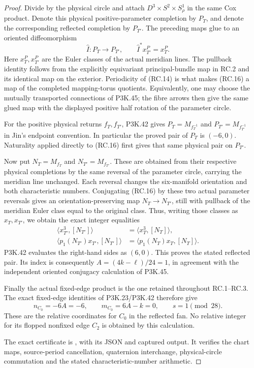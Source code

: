 \begin{proof}
Divide by the physical circle and attach
\(D^3\times S^2\times S^1_\rho\) in the same Cox product. Denote
this physical positive-parameter completion by \(P_T\), and denote
the corresponding reflected completion by \(P_{T'}\). The preceding
maps glue to an oriented diffeomorphism
\[
              \widehat I:P_T\longrightarrow P_{T'},
       \qquad \widehat I^*x^P_{T'}=x^P_T.            \tag{RC.16}
\]
Here \(x^P_T,x^P_{T'}\) are the Euler classes of the actual meridian
lines. The pullback identity follows from the explicitly equivariant
principal-bundle map in RC.2 and its identical map on the exterior.
Periodicity of (RC.14) is what makes (RC.16) a map of the completed
mapping-torus quotients. Equivalently, one may choose the mutually
transported connections of P3K.45; the fibre arrows then give the
same glued map with the displayed positive half rotation of the
parameter circle.

For the positive physical returns \(f_T,f_{T'}\), P3K.42 gives
\(P_T=M_{f_T^{-1}}\) and \(P_{T'}=M_{f_{T'}^{-1}}\) in Jin's
endpoint convention. In particular the proved pair of \(P_T\) is
\((-6,0)\). Naturality applied directly to (RC.16) first gives that
same physical pair on \(P_{T'}\).

Now put \(N_T=M_{f_T}\) and \(N_{T'}=M_{f_{T'}}\). These are obtained
from their respective physical completions by the same reversal of
the parameter circle, carrying the meridian line unchanged. Each
reversal changes the six-manifold orientation and both characteristic
numbers. Conjugating (RC.16) by these two actual parameter reversals
gives an orientation-preserving map \(N_T\to N_{T'}\), still with
pullback of the meridian Euler class equal to the original class.
Thus, writing those classes as \(x_T,x_{T'}\), we obtain the exact
integer equalities
\[
 \begin{aligned}
 \langle x_{T'}^3,[N_{T'}]\rangle
       &=\langle x_T^3,[N_T]\rangle,\\
 \langle p_1(N_{T'})x_{T'},[N_{T'}]\rangle
       &=\langle p_1(N_T)x_T,[N_T]\rangle.
 \end{aligned}                                               \tag{RC.17}
\]
P3K.42 evaluates the right-hand sides as \((6,0)\). This proves the
stated reflected pair. Its index is consequently \(A=(4k-\ell)/24=1\),
in agreement with the independent oriented conjugacy calculation
of P3K.45.

Finally the actual fixed-edge product is the one retained throughout
RC.1--RC.3. The exact fixed-edge identities of P3K.23/P3K.42 therefore
give
\[
        n_{C_0}=-6A=-6,\qquad
        m_{C_0}=6A-k=0,\qquad s=1\pmod {28}.         \tag{RC.18}
\]
These are the relative coordinates for \(C_0\) in the reflected fan.
No relative integer for its flopped nonfixed edge \(C_2\) is obtained
by this calculation.

The exact certificate is ,
with its JSON and captured output. It verifies the chart maps,
source-period cancellation, quaternion interchange, physical-circle
commutation and the stated characteristic-number arithmetic.
\end{proof}
